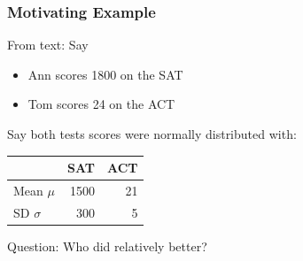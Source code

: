 \documentclass[handout]{beamer}
\newcommand{\blue}[1]{\textcolor{blue2}{#1}}
\begin{document}
\begin{frame}
\frametitle{Motivating Example}
From text:  Say

\begin{itemize}
\item Ann scores 1800 on the SAT
\item Tom scores 24 on the ACT 
\end{itemize}
\pause Say both tests scores were normally distributed with:
\begin{small}
\begin{center}
\begin{tabular}{l|rr}
& SAT & ACT \\
\hline
Mean $\mu$ & 1500 & 21\\
SD $\sigma$ & 300 & 5\\
\end{tabular}
\end{center}
\end{small}

\pause \blue{Question}:  Who did relatively better?  


%
%

\end{frame}
\end{document}
